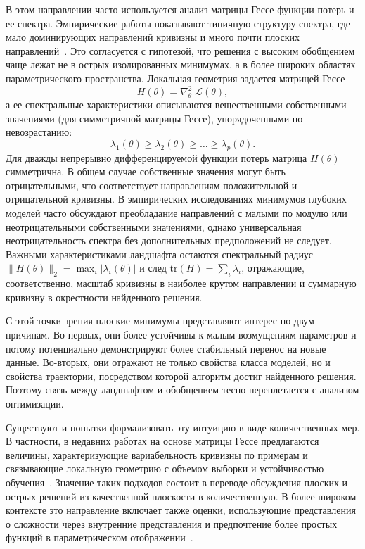 В этом направлении часто используется анализ матрицы Гессе функции потерь и ее спектра.
Эмпирические работы показывают типичную структуру спектра, где мало доминирующих направлений кривизны и много почти плоских направлений~\cite{sagun2017eigenvalues,hessian2019sgd,hessianpowerlaw2022}.
Это согласуется с гипотезой, что решения с высоким обобщением чаще лежат не в острых изолированных минимумах, а в более широких областях параметрического пространства.
Локальная геометрия задается матрицей Гессе
\begin{equation}
H(\theta)=\nabla^2_{\theta}\;\mathcal L(\theta),
\label{eq:ch0sv_hessian_def}
\end{equation}
а ее спектральные характеристики описываются вещественными собственными значениями (для симметричной матрицы Гессе), упорядоченными по невозрастанию:
\begin{equation}
\lambda_1(\theta)\ge \lambda_2(\theta)\ge \dots \ge \lambda_p(\theta).
\label{eq:ch0sv_hessian_spectrum}
\end{equation}
Для дважды непрерывно дифференцируемой функции потерь матрица $H(\theta)$ симметрична. В общем случае собственные значения могут быть отрицательными, что соответствует направлениям положительной и отрицательной кривизны. В эмпирических исследованиях минимумов глубоких моделей часто обсуждают преобладание направлений с малыми по модулю или неотрицательными собственными значениями, однако универсальная неотрицательность спектра без дополнительных предположений не следует.
Важными характеристиками ландшафта остаются спектральный радиус $\|H(\theta)\|_2 = \max_i |\lambda_i(\theta)|$ и след $\mathrm{tr}(H)=\sum_i \lambda_i$, отражающие, соответственно, масштаб кривизны в наиболее крутом направлении и суммарную кривизну в окрестности найденного решения.

С этой точки зрения плоские минимумы представляют интерес по двум причинам.
Во-первых, они более устойчивы к малым возмущениям параметров и потому потенциально демонстрируют более стабильный перенос на новые данные.
Во-вторых, они отражают не только свойства класса моделей, но и свойства траектории, посредством которой алгоритм достиг найденного решения.
Поэтому связь между ландшафтом и обобщением тесно переплетается с анализом оптимизации.

Существуют и попытки формализовать эту интуицию в виде количественных мер.
В частности, в недавних работах на основе матрицы Гессе предлагаются величины, характеризующие вариабельность кривизны по примерам и связывающие локальную геометрию с объемом выборки и устойчивостью обучения~\cite{grabovoi2024unraveling748584228}.
Значение таких подходов состоит в переводе обсуждения плоских и острых решений из качественной плоскости в количественную.
В более широком контексте это направление включает также оценки, использующие представления о сложности через внутренние представления и предпочтение более простых функций в параметрическом отображении~\cite{representation2020complexity,simplicitybias2018}.

